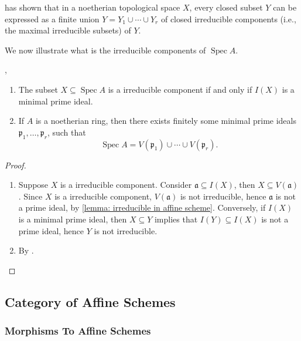 \documentclass[11pt]{article}
\newcommand{\Spec}{\operatorname{Spec}}
\begin{document}
\cite[Proposition 1.5]{hartsAG} has shown that in a noetherian topological space $ X $, 
every closed subset $ Y $ can be expressed as a finite union $ Y = Y_{1} \cup \cdots \cup Y_{r} $ 
of closed irreducible components (i.e., the maximal irreducible subsets) of $ Y $. 

We now illustrate what is the irreducible components of $ \Spec A $. 

\begin{proposition}
    \cite[Exercise 3.7.G]{vakilTheRisingSea}, \cite[Corollary 3.14]{kemper}
    \begin{enumerate}[label = (\alph*)]
        \item The subset $ X \subseteq \Spec A $ is a irreducible component if and only if $ I(X) $ is a minimal prime ideal. 
        \item If $ A $ is a noetherian ring, then there exists finitely some minimal prime ideals $ \mathfrak{p}_{1},\dots,\mathfrak{p}_{r} $, 
        such that 
        $$ \Spec A = V(\mathfrak{p}_{1}) \cup \cdots \cup V(\mathfrak{p}_{r}). $$
    \end{enumerate}
\end{proposition}

\begin{proof}
    \begin{enumerate}[label = (\alph*)]
        \item Suppose $ X $ is a irreducible component. Consider $ \mathfrak{a} \subseteq I(X) $, 
        then $ X \subseteq V(\mathfrak{a}) $. Since $ X $ is a irreducible component, $ V(\mathfrak{a}) $ is 
        not irreducible, hence $ \mathfrak{a} $ is not a prime ideal, by \autoref{lemma: irreducible in affine scheme}. 
        Conversely, if $ I(X) $ is a minimal prime ideal, then $ X \subseteq Y $ implies that $ I(Y) \subseteq I(X) $ 
        is not a prime ideal, hence $ Y $ is not irreducible. 

        \item By \cite[Proposition 1.5]{hartsAG}. 
    \end{enumerate}
\end{proof}

\subsection{Category of Affine Schemes}

\subsubsection{Morphisms To Affine Schemes}
\end{document}
